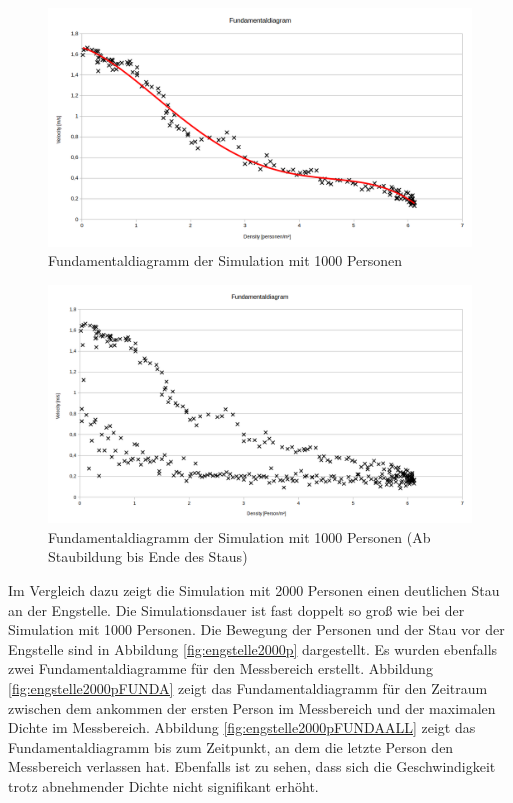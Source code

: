 \begin{figure}[ht]
	\centering
  \includegraphics[width=\textwidth]{abbildungen/engstelle/1000P/fundamentalDiagram1000persons.png}
	\caption{Fundamentaldiagramm der Simulation mit 1000 Personen}
	\label{fig:engstelle1000pFUNDA}
\end{figure}

\begin{figure}[ht]
	\centering
  \includegraphics[width=\textwidth]{abbildungen/engstelle/1000P/fundamentalDiagram1000personsALLDATA.png}
	\caption{Fundamentaldiagramm der Simulation mit 1000 Personen (Ab Staubildung bis Ende des Staus)}
	\label{fig:engstelle1000pFUNDAALL}
\end{figure}

Im Vergleich dazu zeigt die Simulation mit 2000 Personen einen deutlichen Stau an der Engstelle. Die Simulationsdauer ist fast doppelt so groß wie bei der Simulation mit 1000 Personen. Die Bewegung der Personen und der Stau vor der Engstelle sind in Abbildung \ref{fig:engstelle2000p} dargestellt. Es wurden ebenfalls zwei Fundamentaldiagramme für den Messbereich erstellt. Abbildung \ref{fig:engstelle2000pFUNDA} zeigt das Fundamentaldiagramm für den Zeitraum zwischen dem ankommen der ersten Person im Messbereich und der maximalen Dichte im Messbereich. Abbildung \ref{fig:engstelle2000pFUNDAALL} zeigt das Fundamentaldiagramm bis zum Zeitpunkt, an dem die letzte Person den Messbereich verlassen hat. Ebenfalls ist zu sehen, dass sich die Geschwindigkeit trotz abnehmender Dichte nicht signifikant erhöht.\\

